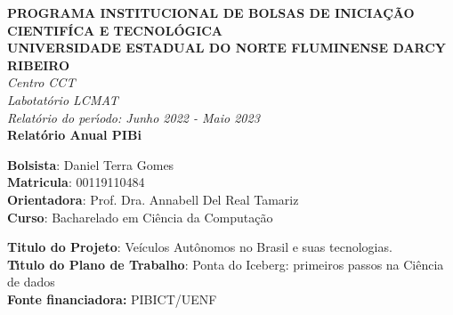 \documentclass[
	12pt,				%
	openany, %
	a4paper,			%
	english,			%
	french,				%
	spanish,			%
	brazil				%
	]{abntex2}
\begin{document}
\begin{center}
\large
\textbf{PROGRAMA INSTITUCIONAL DE BOLSAS DE INICIA\c{C}\~{A}O CIENTIF\'{I}CA E TECNOL\'{O}GICA\\\vspace{0,5cm}
UNIVERSIDADE ESTADUAL DO NORTE FLUMINENSE DARCY RIBEIRO\\
}
\textit{Centro CCT \\
Labotat\'{o}rio LCMAT\\
\vspace{1cm}
Relat\'{o}rio do per\'{\i}odo: Junho 2022 - Maio 2023}\\
\vspace{1,5cm}
\textbf{Relat\'{o}rio Anual PIBi}\\\vspace{5cm}
\end{center}
\textbf{Bolsista}: Daniel Terra Gomes\\
\textbf{Matricula}: 00119110484\\
\textbf{Orientadora}: Prof. Dra. Annabell Del Real Tamariz  \\
\textbf{Curso}: Bacharelado em Ci\^{e}ncia da Computa\c{c}\~{a}o\\
\vspace{3cm}
\begin{center}
\textbf{Titulo do Projeto}: Veículos Autônomos no Brasil e suas tecnologias.\\
\textbf{T\'{\i}tulo do Plano de Trabalho}: Ponta do Iceberg: primeiros passos na Ciência de dados\\
\textbf{Fonte financiadora:} PIBICT/UENF
\end{center}




\frenchspacing




\end{document}
